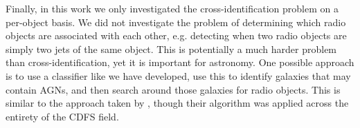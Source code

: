   Finally, in this work we only investigated the cross-identification problem on
  a per-object basis. We did not investigate the problem of determining which
  radio objects are associated with each other, e.g. detecting when two radio
  objects are simply two jets of the same object. This is potentially a much
  harder problem than cross-identification, yet it is important for astronomy.
  One possible approach is to use a classifier like we have developed, use this
  to identify galaxies that may contain AGNs, and then search around those
  galaxies for radio objects. This is similar to the approach taken by
  \citet{fan15}, though their algorithm was applied across the entirety of the
  CDFS field.
